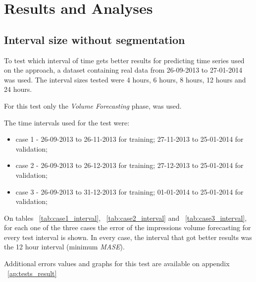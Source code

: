 \chapter{Results and Analyses} \label{chap:concl}

\section*{}

\section{Interval size without segmentation}

To test which interval of time gets better results for predicting time series
used on the approach, a dataset containing real data from 26-09-2013 to
27-01-2014 was used. The interval sizes tested were 4 hours, 6 hours, 8 hours,
12 hours and 24 hours.

For this test only the \emph{Volume Forecasting} phase, was used.

The time intervals used for the test were:
\begin{itemize}
\item case 1 - 26-09-2013 to 26-11-2013 for training;
27-11-2013 to 25-01-2014 for validation;
\item case 2 - 26-09-2013 to 26-12-2013 for training; 27-12-2013 to 25-01-2014
for validation;
\item case 3 - 26-09-2013 to 31-12-2013 for training; 01-01-2014 to 25-01-2014
for validation;
\end{itemize}

On tables ~\ref{tab:case1_interval}, ~\ref{tab:case2_interval} and
~\ref{tab:case3_interval}, for each one of the three cases the error of the
impressions volume forecasting for every test interval is shown.
In every case, the interval that got better results was the 12 hour interval
(minimum \emph{MASE}).

Additional errors values and graphs for this test are available on appendix
~\ref{ap:tests_result}

